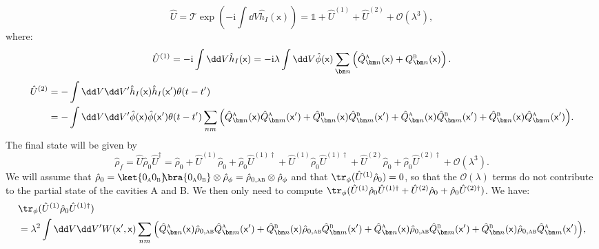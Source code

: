 \documentclass[letterpaper,12pt,titlepage,oneside,final]{book}
\newcommand{\openone}{\mathds{1}}
\newcommand{\mf}{\mathsf}%
\newcommand{\ii}{\mathrm{i}}
\newcommand{\tc}[1]{\textsc{#1}}
\begin{document}
{\begin{equation}
    \hat{U} = \mathcal{T}\exp(- \ii \int \dd V \hat{h}_I(\mf x)) = \openone + \hat{U}^{(1)} + \hat{U}^{(2)} + \mathcal{O}(\lambda^3),
\end{equation}
where:
\begin{align}
    \hat{U}^{(1)} = - \ii \int \dd V \hat{h}_I(\mf x) = - \ii \lambda \int \dd V  \hat{\phi}(\mf x)  \sum_{\bm n} \left(\hat{Q}^\tc{a}_{\bm n}(\mf x) +  Q_{\bm n}^\tc{b}(\mf x)\right).
\end{align}{\footnotesize
\begin{align}
    \hat{U}^{(2)}& =  - \int \dd V\dd V' \hat{h}_I(\mf x) \hat{h}_I(\mf x')\theta(t-t')\\&= - \int \dd V \dd V' \hat{\phi}(\mf x)\hat{\phi}(\mf x')\theta(t-t') \sum_{nm} \Big( \hat{Q}_{\bm n}^{\tc{a}}(\mf x)\hat{Q}_{\bm m}^{\tc{a}}(\mf x')+ \hat{Q}^\tc{b}_{\bm n}(\mf x)\hat{Q}_{\bm m}^{\tc{b}}(\mf x')+  \hat{Q}^\tc{a}_{\bm n}(\mf x)\hat{Q}^\tc{b}_{\bm m}(\mf x') +  \hat{Q}^\tc{b}_{\bm n}(\mf x) \hat{Q}^\tc{a}_{\bm m}(\mf x')\Big).
\end{align}}
The final state will be given by
\begin{equation}
    \hat{\rho}_f = \hat{U}\hat{\rho}_0\hat{U}^\dagger = \hat{\rho}_0 + \hat{U}^{(1)}\hat{\rho}_0 + \hat{\rho}_0 \hat{U}^{(1)\dagger} + \hat{U}^{(1)}\hat{\rho}_0\hat{U}^{(1)\dagger}+ \hat{U}^{(2)}\hat{\rho}_0 + \hat{\rho}_0 \hat{U}^{(2)\dagger} + \mathcal{O}(\lambda^3).
\end{equation}
We will assume that $\hat{\rho}_0 = \ket{0_\tc{a}0_\tc{b}}\!\!\bra{0_\tc{a}0_\tc{b}}\otimes \hat{\rho}_\phi = \hat{\rho}_{0,\tc{ab}}\otimes \hat{\rho}_\phi$ and that $\tr_\phi(\hat{U}^{(1)}\hat{\rho}_0) = 0$, so that the $\mathcal{O}(\lambda)$ terms do not contribute to the partial state of the cavities A and B. We then only need to compute \mbox{$\tr_\phi(\hat{U}^{(1)}\hat{\rho}_0\hat{U}^{(1)\dagger}+ \hat{U}^{(2)}\hat{\rho}_0 + \hat{\rho}_0 \hat{U}^{(2)\dagger})$}. We have:
{\footnotesize
\begin{align}
    &\tr_\phi(\hat{U}^{(1)}\hat{\rho}_0\hat{U}^{(1)\dagger}) \nonumber\\&= \lambda^2\int \dd V\dd V' W(\mf x', \mf x)  \sum_{nm} \Big( \hat{Q}^{\tc{a}}_{\bm n}(\mf x)\hat{\rho}_{0,\tc{ab}}\hat{Q}^{\tc{a}}_{\bm m}(\mf x')+ \hat{Q}^\tc{b}_{\bm n}(\mf x)\hat{\rho}_{0,\tc{ab}}\hat{Q}_{\bm m}^{\tc{b}}(\mf x')+ \hat{Q}^\tc{a}_{\bm n}(\mf x)\hat{\rho}_{0,\tc{ab}}\hat{Q}^{\tc{b}}_{\bm m}(\mf x') +  \hat{Q}^\tc{b}_{\bm n}(\mf x) \hat{\rho}_{0,\tc{ab}}\hat{Q}^{\tc{a}}_{\bm m}(\mf x')\Big),

\end{align}}}
\end{document}
